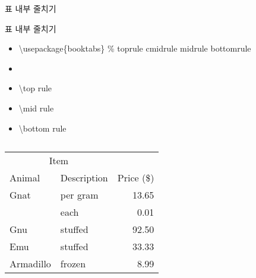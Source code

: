 \documentclass[ aspectratio=149,  14pt,blue,xcolor=pdftex,dvipsnames,table,handout,notes]{beamer}
\begin{document}
		\begin{frame}[t]{표 내부 줄치기}

		\begin{block}{표 내부 줄치기}
		\begin{itemize}
		\item[] \textbackslash usepackage\{booktabs\}	\% toprule cmidrule midrule bottomrule  
		\item[]
		\item[]	\textbackslash top rule
		\item[]	\textbackslash mid rule
		\item[]	\textbackslash bottom rule
		\end{itemize}
		\end{block}


		\begin{columns}[t]
		\begin{column}{.4\textwidth}
				\begin{example}
					\begin{tabular}{llr}
					\toprule
					\multicolumn{2}{c}{Item} \\
					\cmidrule(r){1-2}
					Animal & Description & Price (\$)\\
					\midrule
					Gnat & per gram & 13.65 \\
					& each & 0.01 \\
					Gnu & stuffed & 92.50 \\
					Emu & stuffed & 33.33 \\
					Armadillo & frozen & 8.99 \\
					\bottomrule
					\end{tabular}
				\end{example}
		\end{column}


\end{columns}
\end{frame}
\end{document}

